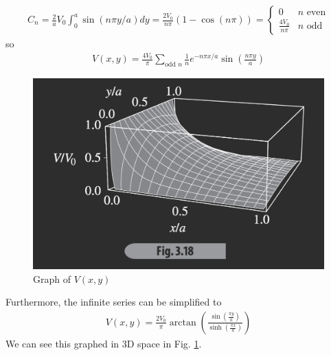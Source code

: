 \documentclass[../main.tex]{subfiles}
\begin{document}
\begin{align*}
    C_n = \frac{2}{a} V_0 \int_0^a \sin(n\pi y/a) dy = \frac{2V_0}{n\pi} (1 - \cos(n\pi)) 
    = \begin{cases}
        0 & n \text{ even} \\
        \frac{4V_0}{n\pi} & n \text{ odd}
    \end{cases}
\end{align*}
so
\begin{align*}
    \boxed{
        V(x,y) = \frac{4V_0}{\pi} \sum_{\textrm{odd } n} \frac{1}{n} e^{-n\pi x/a} \sin(\frac{n\pi y}{a})
    }
\end{align*}
\begin{figure}[ht]
    \centering
    \includegraphics[width=0.5\linewidth]{fig3_18.png}
    \caption{Graph of $V(x,y)$}
    \label{fig:lecture3_18}
\end{figure}
\newpage
Furthermore, the infinite series can be simplified to
\begin{align*}
    V(x,y) = \frac{2V_0}{\pi} \arctan(\frac{\sin(\frac{\pi y}{a})}{\sinh(\frac{\pi x}{a})})
\end{align*}
We can see this graphed in 3D space in Fig. \ref{fig:lecture3_18}.
\end{document}
